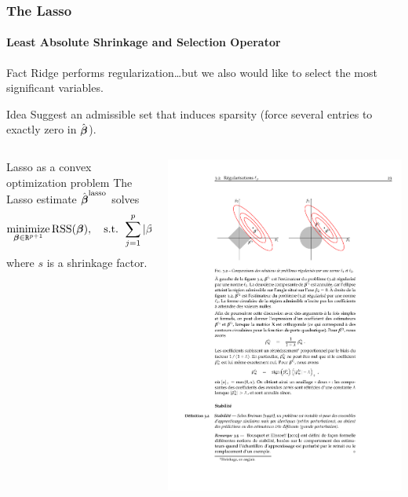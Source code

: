 \documentclass[10pt, c, xcolor=x11names]{beamer}\usepackage[]{graphicx}\usepackage[]{color}
\begin{document}
\begin{frame}
  \frametitle{The Lasso}
  \framesubtitle{Least Absolute Shrinkage and Selection Operator}

  \begin{block}{Fact}
    Ridge  performs  regularization\dots but  we  also  would like  to
    select the most significant variables.
  \end{block}

  \vfill

  \begin{block}{Idea}
    Suggest  an admissible  set that  induces  \alert{sparsity} (force
    several entries to exactly zero in $\hat{\boldsymbol\beta}$).
  \end{block}

  \vfill

  \begin{overlayarea}{\textwidth}{.4\textheight}
    \begin{columns}
      \begin{column}[c]{.6\textwidth}
        \begin{block}{Lasso as a convex optimization problem}
          The Lasso estimate $\hat{\boldsymbol\beta}^{\text{lasso}}$ solves
          \begin{equation*}
            \mathop{\mathrm{minimize}}_{\boldsymbol\beta\in\texttt{R}^{p+1}} \mathrm{RSS}(\boldsymbol\beta), \quad \text{s.t.  }  \sum_{j=1}^p
            \left|\beta_j\right|  \leq s,
          \end{equation*}
          where $s$ is a shrinkage factor.
        \end{block}
      \end{column}
      \begin{column}{.4\textwidth}
        \includegraphics[width=.7\textwidth]{figures/lasso_set}
      \end{column}
    \end{columns}
  \end{overlayarea}

\end{frame}
\end{document}
